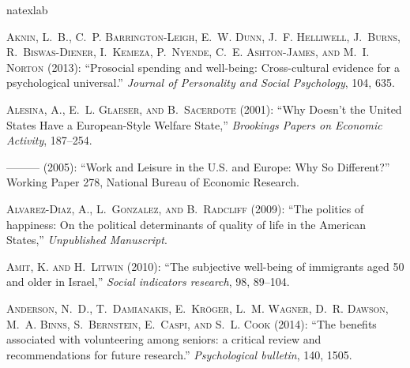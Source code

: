 \documentclass[10pt, letterpaper]{article}
\begin{document}
\begin{spacing}{1.4}
%

\begin{thebibliography}{87}
\newcommand{\enquote}[1]{``#1''}
\expandafter\ifx\csname natexlab\endcsname\relax\def\natexlab#1{#1}\fi

\textsc{Aknin, L.~B., C.~P. Barrington-Leigh, E.~W. Dunn, J.~F. Helliwell,
  J.~Burns, R.~Biswas-Diener, I.~Kemeza, P.~Nyende, C.~E. Ashton-James, and
  M.~I. Norton} (2013): \enquote{Prosocial spending and well-being:
  Cross-cultural evidence for a psychological universal.} \emph{Journal of
  Personality and Social Psychology}, 104, 635.

\textsc{Alesina, A., E.~L. Glaeser, and B.~Sacerdote} (2001): \enquote{Why
  Doesn't the United States Have a European-Style Welfare State,}
  \emph{Brookings Papers on Economic Activity}, 187--254.

---\hspace{-.1pt}---\hspace{-.1pt}--- (2005): \enquote{Work and Leisure in the
  U.S. and Europe: Why So Different?} Working Paper 278, National Bureau of
  Economic Research.

\textsc{Alvarez-Diaz, A., L.~Gonzalez, and B.~Radcliff} (2009): \enquote{{The
  politics of happiness: On the political determinants of quality of life in
  the American States},} \emph{Unpublished Manuscript}.

\textsc{Amit, K. and H.~Litwin} (2010): \enquote{The subjective well-being of
  immigrants aged 50 and older in Israel,} \emph{Social indicators research},
  98, 89--104.

\textsc{Anderson, N.~D., T.~Damianakis, E.~Kr{\"o}ger, L.~M. Wagner, D.~R.
  Dawson, M.~A. Binns, S.~Bernstein, E.~Caspi, and S.~L. Cook} (2014):
  \enquote{The benefits associated with volunteering among seniors: a critical
  review and recommendations for future research.} \emph{Psychological
  bulletin}, 140, 1505.


\end{thebibliography}
\end{spacing}
\end{document}
